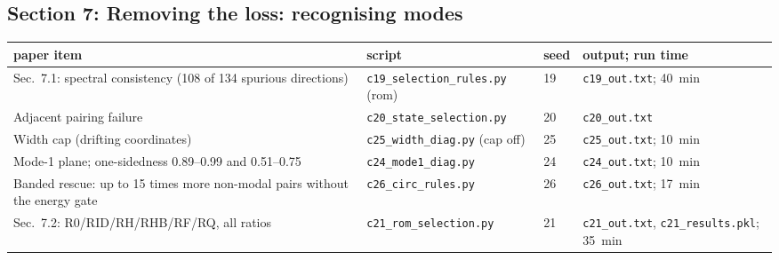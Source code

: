 \documentclass[10pt]{article}
\newcommand{\f}[1]{\texttt{#1}}
\begin{document}
\subsection*{Section 7: Removing the loss: recognising modes}
\begin{longtable}{L{0.31\textwidth}L{0.25\textwidth}L{0.08\textwidth}L{0.25\textwidth}}
\toprule
paper item & script & seed & output; run time\\ \midrule
Sec.~7.1: spectral consistency (108 of 134 spurious directions) & \f{c19\_\allowbreak{}selection\_\allowbreak{}rules.py} (rom) & 19 & \f{c19\_\allowbreak{}out.txt}; 40~min\\
Adjacent pairing failure & \f{c20\_\allowbreak{}state\_\allowbreak{}selection.py} & 20 & \f{c20\_\allowbreak{}out.txt}\\
Width cap (drifting coordinates) & \f{c25\_\allowbreak{}width\_\allowbreak{}diag.py} (cap off) & 25 & \f{c25\_\allowbreak{}out.txt}; 10~min\\
Mode-1 plane; one-sidedness 0.89--0.99 and 0.51--0.75 & \f{c24\_\allowbreak{}mode1\_\allowbreak{}diag.py} & 24 & \f{c24\_\allowbreak{}out.txt}; 10~min\\
Banded rescue: up to 15 times more non-modal pairs without the energy gate & \f{c26\_\allowbreak{}circ\_\allowbreak{}rules.py} & 26 & \f{c26\_\allowbreak{}out.txt}; 17~min\\
Sec.~7.2: R0/RID/RH/RHB/RF/RQ, all ratios & \f{c21\_\allowbreak{}rom\_\allowbreak{}selection.py} & 21 & \f{c21\_\allowbreak{}out.txt}, \f{c21\_\allowbreak{}results.pkl}; 35~min\\
\bottomrule
\end{longtable}
\end{document}
